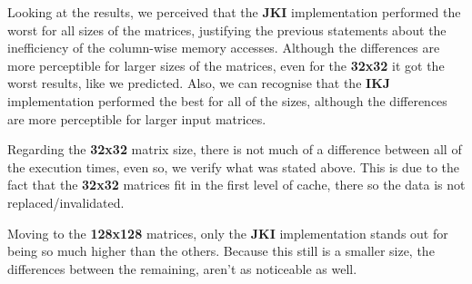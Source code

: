 \documentclass[twoside,twocolumn]{article}
\begin{document}
\begin{table}[h]
\centering
{}
\caption{First implementations execution time.}
\label{tab:firsttimeresults}
\end{table}

Looking at the results, we perceived that the \textbf{JKI} implementation performed the worst for all sizes of the matrices, justifying the previous statements about the inefficiency of the column-wise memory accesses. Although the differences are more perceptible for larger sizes of the matrices, even for the \textbf{32x32} it got the worst results, like we predicted. Also, we can recognise that the \textbf{IKJ} implementation performed the best for all of the sizes, although the differences are more perceptible for larger input matrices.

Regarding the \textbf{32x32} matrix size, there is not much of a difference between all of the execution times, even so, we verify what was stated above. This is due to the fact that the \textbf{32x32} matrices fit in the first level of cache, there so the data is not replaced/invalidated.

Moving to the \textbf{128x128} matrices, only the \textbf{JKI} implementation stands out for being so much higher than the others. Because this still is a smaller size, the differences between the remaining, aren't as noticeable as well.
\end{document}
